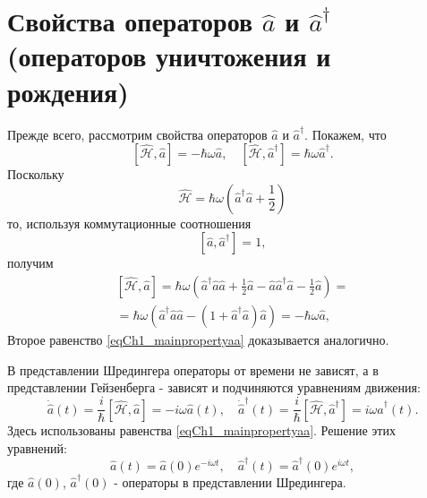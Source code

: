 \section{Свойства операторов $ \hat a $ и $ \hat a ^\dag $ (операторов
  уничтожения и рождения)} 
Прежде всего, рассмотрим свойства операторов $\hat{a}$  и
$\hat{a}^{\dag}$.  Покажем, что 
\begin{equation}
\left[\hat{\mathcal{H}}, \hat{a}\right] = 
- \hbar \omega \hat{a}, \quad
\left[\hat{\mathcal{H}}, \hat{a}^{\dag}\right] = 
\hbar \omega \hat{a}^{\dag}.
\label{eqCh1_mainpropertyaa}
\end{equation}
Поскольку  
\[
\hat{\mathcal{H}} =  
\hbar \omega \left(\hat{a}^{\dag} \hat{a} +
\frac{1}{2}\right)
\]
то, используя коммутационные соотношения
\[
\left[\hat{a}, \hat{a}^{\dag}\right] = 1,
\]  
получим
\begin{eqnarray}
\left[\hat{\mathcal{H}}, \hat{a}\right] = 
\hbar \omega \left( 
\hat{a}^{\dag}\hat{a}\hat{a} + \frac{1}{2} \hat{a} -
\hat{a}\hat{a}^{\dag}\hat{a} - \frac{1}{2}\hat{a} 
\right)
= 
\nonumber \\ 
= \hbar \omega\left(
\hat{a}^{\dag}\hat{a}\hat{a} - \left(1 + \hat{a}^{\dag}\hat{a}\right)\hat{a} 
\right) = - \hbar \omega \hat{a} 
,
\nonumber
\end{eqnarray}
Второе равенство \eqref{eqCh1_mainpropertyaa} доказывается
аналогично. 

В представлении Шредингера операторы от времени не зависят, а в
представлении Гейзенберга - зависят и подчиняются уравнениям движения: 
\begin{equation}
\dot{\hat{a}}\left(t\right) = \frac{i}{\hbar}\left[\hat{\mathcal{H}},
  \hat{a}\right] = -i \omega \hat{a}\left(t\right), \quad
\dot{\hat{a}}^{\dag}\left(t\right) = \frac{i}{\hbar}\left[\hat{\mathcal{H}},
  \hat{a}^{\dag}\right] = i \omega \hat{a}^{\dag}\left(t\right).
\label{eqCh1_54}
\end{equation}
Здесь использованы равенства \eqref{eqCh1_mainpropertyaa}. Решение
этих уравнений: 
\begin{equation}
\hat{a}\left(t\right) = \hat{a}\left(0\right) e^{- i \omega t}, \quad
\hat{a}^{\dag}\left(t\right) = \hat{a}^{\dag}\left(0\right) e^{i \omega t}, 
\end{equation}
где  $\hat{a}\left(0\right)$, $\hat{a}^{\dag}\left(0\right)$ - операторы
в представлении Шредингера.
